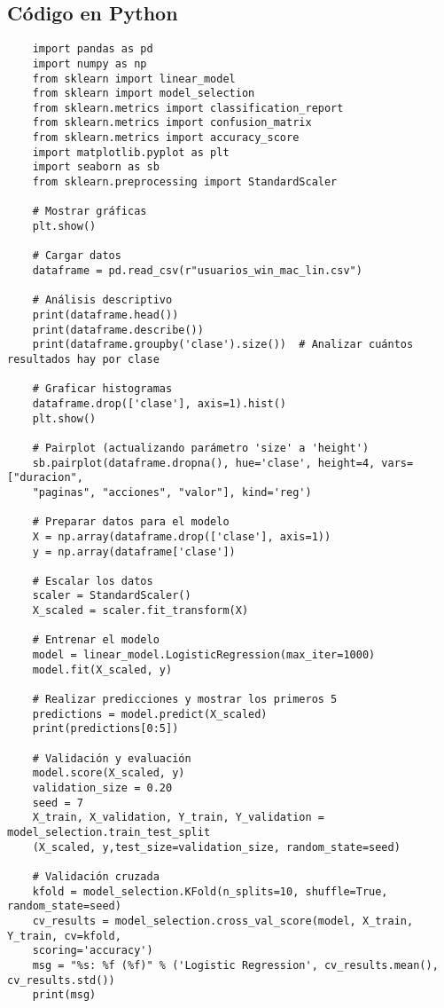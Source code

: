 \documentclass{article}
\begin{document}
\subsection{C\'odigo en Python}
\begin{verbatim}
    import pandas as pd
    import numpy as np
    from sklearn import linear_model
    from sklearn import model_selection
    from sklearn.metrics import classification_report
    from sklearn.metrics import confusion_matrix
    from sklearn.metrics import accuracy_score
    import matplotlib.pyplot as plt
    import seaborn as sb
    from sklearn.preprocessing import StandardScaler
    
    # Mostrar gráficas
    plt.show()
    
    # Cargar datos
    dataframe = pd.read_csv(r"usuarios_win_mac_lin.csv")
    
    # Análisis descriptivo
    print(dataframe.head())
    print(dataframe.describe())
    print(dataframe.groupby('clase').size())  # Analizar cuántos resultados hay por clase
    
    # Graficar histogramas
    dataframe.drop(['clase'], axis=1).hist()
    plt.show()
    
    # Pairplot (actualizando parámetro 'size' a 'height')
    sb.pairplot(dataframe.dropna(), hue='clase', height=4, vars=["duracion", 
    "paginas", "acciones", "valor"], kind='reg')
    
    # Preparar datos para el modelo
    X = np.array(dataframe.drop(['clase'], axis=1))  
    y = np.array(dataframe['clase'])
    
    # Escalar los datos
    scaler = StandardScaler()
    X_scaled = scaler.fit_transform(X) 
    
    # Entrenar el modelo
    model = linear_model.LogisticRegression(max_iter=1000)
    model.fit(X_scaled, y)
    
    # Realizar predicciones y mostrar los primeros 5
    predictions = model.predict(X_scaled)
    print(predictions[0:5])
    
    # Validación y evaluación
    model.score(X_scaled, y)
    validation_size = 0.20
    seed = 7
    X_train, X_validation, Y_train, Y_validation = model_selection.train_test_split
    (X_scaled, y,test_size=validation_size, random_state=seed)
    
    # Validación cruzada
    kfold = model_selection.KFold(n_splits=10, shuffle=True, random_state=seed)
    cv_results = model_selection.cross_val_score(model, X_train, Y_train, cv=kfold, 
    scoring='accuracy')
    msg = "%s: %f (%f)" % ('Logistic Regression', cv_results.mean(), cv_results.std())
    print(msg)
    

\end{verbatim}
\end{document}
